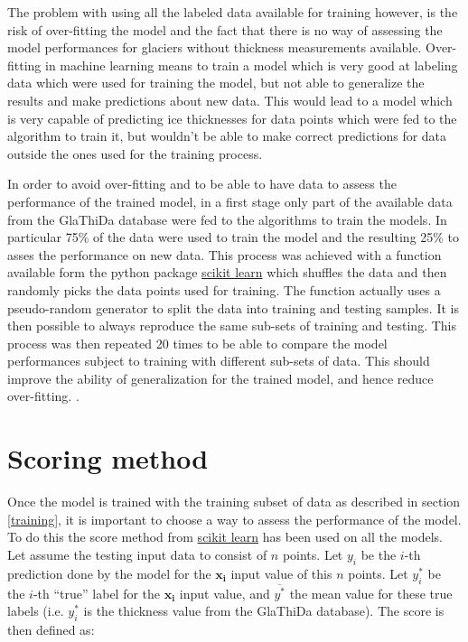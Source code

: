 The problem with using all the labeled data available for training however, is the risk of over-fitting the model and the fact that there is no way of assessing the model performances for glaciers without thickness measurements available.
Over-fitting in machine learning means to train a model which is very good at labeling data which were used for training the model, but not able to generalize the results and make predictions about new data. This would lead to a model which is very capable of predicting ice thicknesses for data points which were fed to the algorithm to train it, but wouldn't be able to make correct predictions for data outside the ones used for the training process. 

In order to avoid over-fitting and to be able to have data to assess the performance of the trained model, in a first stage only part of the available data from the GlaThiDa database were fed to the algorithms to train the models. In particular 75\% of the data were used to train the model and the resulting 25\% to asses the performance on new data. This process was achieved with a function available form the python package \href{https://scikit-learn.org/}{scikit learn} which shuffles the data and then randomly picks the data points used for training. The function actually uses a pseudo-random generator to split the data into training and testing samples. It is then possible to always reproduce the same sub-sets of training and testing. This process was then repeated 20 times to be able to compare the model performances subject to training with different sub-sets of data. This should improve the ability of generalization for the trained model, and hence reduce over-fitting. \citep{crossval1995}.

\section{Scoring method}\label{scoring}
Once the model is trained with the training subset of data as described in section \ref{training}, it is important to choose a way to assess the performance of the model. To do this the score method from \href{https://scikit-learn.org/}{scikit learn} has been used on all the models. Let assume the testing input data to consist of $n$ points. Let $y_i$ be the $i$-th prediction done by the model for the $\mathbf{x_i}$ input value of this $n$ points. Let $y^*_i$ be the $i$-th ``true'' label for the $\mathbf{x_i}$ input value, and $\overline{y^*}$ the mean value for these true labels (i.e. $y^*_i$ is the thickness value from the GlaThiDa database). The score is then defined as:

